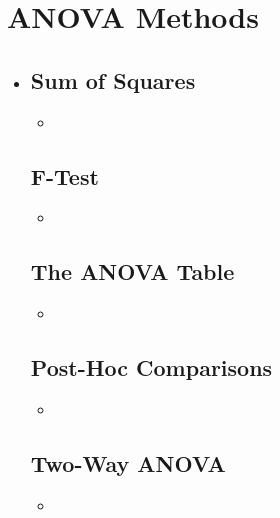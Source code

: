 \section{ANOVA Methods}
\begin{itemize}
  \item[]

  \subsection{Sum of Squares}
  \begin{itemize}
    \item 
  \end{itemize}

  \subsection{F-Test}
  \begin{itemize}
    \item 
  \end{itemize}

  \subsection{The ANOVA Table}
  \begin{itemize}
    \item 
  \end{itemize}

  \subsection{Post-Hoc Comparisons}
  \begin{itemize}
    \item 
  \end{itemize}
  
  \subsection{Two-Way ANOVA}
  \begin{itemize}
    \item 
  \end{itemize}
  
\end{itemize}

